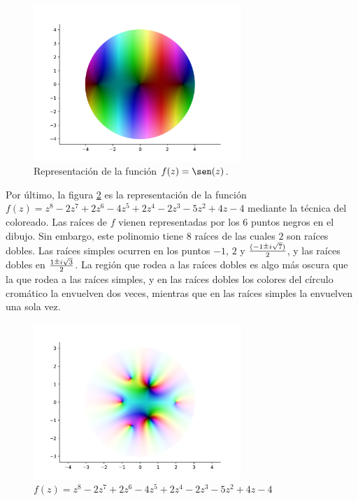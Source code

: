 \begin{figure}[!htbp]
    \centering
    \includegraphics[width=0.7\textwidth]{../Aplicacion/sen(z).png}
    \caption{Representación de la función $f(z) = \sen(z)$.}
    \label{fig:sen(z)}
\end{figure}

Por último, la figura \ref{fig:z^8-2z^7+2z^6-4z^5+2z^4-2z^3-5z^2+4z-4} es la representación de la función $f(z) = z^8-2z^7+2z^6-4z^5+2z^4-2z^3-5z^2+4z-4$ mediante la técnica del coloreado. Las raíces de $f$ vienen representadas por los $6$ puntos negros en el dibujo. Sin embargo, este polinomio tiene $8$ raíces de las cuales $2$ son raíces dobles. Las raíces simples ocurren en los puntos $-1$, $2$ y $\frac{(-1 \rpm i \sqrt{7})}{2}$, y las raíces dobles en $\frac{1 \rpm i \sqrt{3}}{2}$.  La región que rodea a las raíces dobles es algo más oscura que la que rodea a las raíces simples, y en las raíces dobles los colores del círculo cromático la envuelven dos veces, mientras que en las raíces simples la envuelven una sola vez. \\

\begin{figure}[!htbp]
    \centering
    \includegraphics[width=0.7\textwidth]{../Aplicacion/z^8-2z^7+2z^6-4z^5+2z^4-2z^3-5z^2+4z-4.png}
    \caption{$f(z) = z^8-2z^7+2z^6-4z^5+2z^4-2z^3-5z^2+4z-4$}
    \label{fig:z^8-2z^7+2z^6-4z^5+2z^4-2z^3-5z^2+4z-4}
\end{figure}

